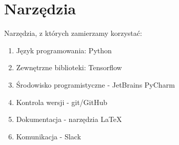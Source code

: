 \section{Narzędzia}

Narzędzia, z których zamierzamy korzystać:

\begin{enumerate}
\item Język programowania: Python	
\item Zewnętrzne biblioteki: Tensorflow
\item Środowisko programistyczne - JetBrains PyCharm
\item Kontrola wersji - git/GitHub
\item Dokumentacja - narzędzia LaTeX
\item Komunikacja - Slack
\end{enumerate}